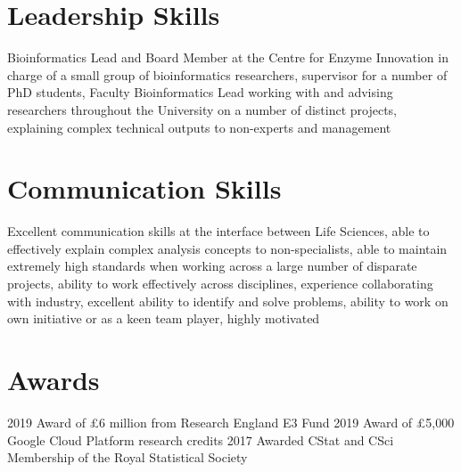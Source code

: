 \documentclass[letterpaper]{twentysecondcv} %
\begin{document}
\section{Leadership Skills}

Bioinformatics Lead and Board Member at the Centre for Enzyme Innovation in charge of a small group of bioinformatics researchers, supervisor for a number of PhD students, Faculty Bioinformatics Lead working with and advising researchers throughout the University on a number of distinct projects, explaining complex technical outputs to non-experts and management \\


\section{Communication Skills}

Excellent communication skills at the interface between Life Sciences, able to effectively explain complex analysis concepts to non-specialists, able to maintain extremely high standards when working across a large number of disparate projects, ability to work effectively across disciplines, experience collaborating with industry, excellent ability to identify and solve problems, ability to work on own initiative or as a keen team player, highly motivated \\


\section{Awards}

\begin{twentyshort}
  \twentyitemshort
    {2019}
    {Award of £6 million from Research England E3 Fund}
  \twentyitemshort
    {2019}
    {Award of £5,000 Google Cloud Platform research credits} 
  \twentyitemshort
    {2017}
    {Awarded CStat and CSci Membership of the Royal Statistical Society}
\end{twentyshort}
\end{document}
